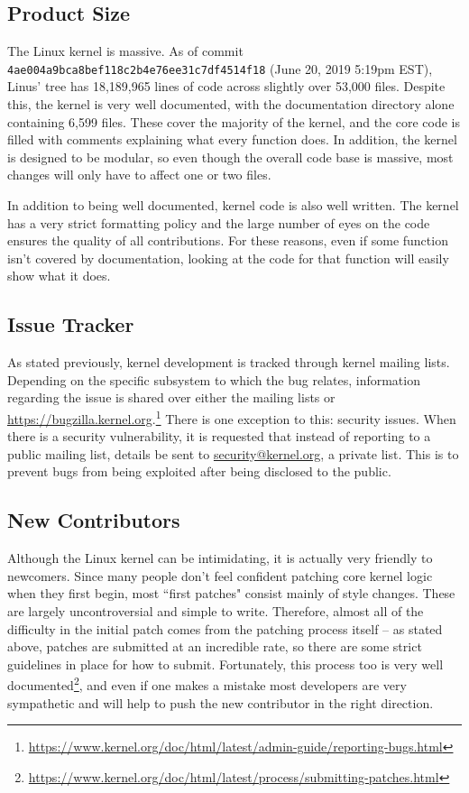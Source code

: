 \documentclass[11pt]{article}
\begin{document}
\subsection{Product Size}
\label{subsec:kernel_codebase}

The Linux kernel is massive.  As of commit \texttt{4ae004a9bca8bef118c2b4e76ee31c7df4514f18} (June 20, 2019 5:19pm EST), Linus' tree has 18,189,965 lines of code across slightly over 53,000 files.  Despite this, the kernel is very well documented, with the documentation directory alone containing 6,599 files.  These cover the majority of the kernel, and the core code is filled with comments explaining what every function does.  In addition, the kernel is designed to be modular, so even though the overall code base is massive, most changes will only have to affect one or two files.

In addition to being well documented, kernel code is also well written.  The kernel has a very strict formatting policy and the large number of eyes on the code ensures the quality of all contributions.  For these reasons, even if some function isn't covered by documentation, looking at the code for that function will easily show what it does.

\subsection{Issue Tracker}
\label{subsec:kernel_issue_tracker}

As stated previously, kernel development is tracked through kernel mailing lists.  Depending on the specific subsystem to which the bug relates, information regarding the issue is shared over either the mailing lists or \url{https://bugzilla.kernel.org}.\footnote{\url{https://www.kernel.org/doc/html/latest/admin-guide/reporting-bugs.html}}  There is one exception to this: security issues.  When there is a security vulnerability, it is requested that instead of reporting to a public mailing list, details be sent to \href{mailto:security@kernel.org}{security@kernel.org}, a private list.  This is to prevent bugs from being exploited after being disclosed to the public.

\subsection{New Contributors}
\label{subsec:kernel_newbies}

Although the Linux kernel can be intimidating, it is actually very friendly to newcomers.  Since many people don't feel confident patching core kernel logic when they first begin, most ``first patches" consist mainly of style changes.  These are largely uncontroversial and simple to write.  Therefore, almost all of the difficulty in the initial patch comes from the patching process itself -- as stated above, patches are submitted at an incredible rate, so there are some strict guidelines in place for how to submit.  Fortunately, this process too is very well documented\footnote{\url{https://www.kernel.org/doc/html/latest/process/submitting-patches.html}}, and even if one makes a mistake most developers are very sympathetic and will help to push the new contributor in the right direction.
\end{document}
